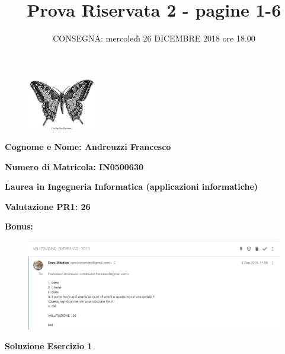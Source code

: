 \documentclass[11pt,reqno]{amsart}
\title{Prova Riservata 2 -  pagine 1-6}
\author{CONSEGNA: mercoled\`{\i} 26 DICEMBRE 2018 ore 18.00}
\begin{document}
\maketitle

\begin{figure}[ht!]
\centering
\includegraphics[width=30mm]{machaon.jpg}
\end{figure}

{\bf Cognome e Nome: Andreuzzi Francesco}

\bigskip
{\bf Numero di Matricola: IN0500630}

\bigskip
{\bf Laurea in Ingegneria Informatica (applicazioni informatiche)}

\bigskip
{\bf Valutazione PR1: 26}

\bigskip
{\bf Bonus:}

\bigskip

\begin{figure}[ht!]
\centering
\includegraphics[width=165mm]{pr1.png}
\end{figure}

\bigskip


\bigskip

\newpage

\centerline{\bf Soluzione Esercizio 1 }
\bigskip
\end{document}
